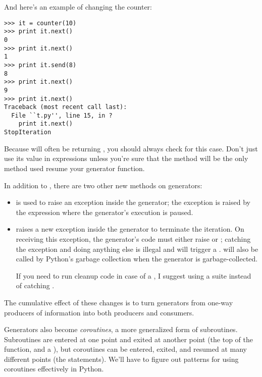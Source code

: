 \documentclass{howto}
\begin{document}
And here's an example of changing the counter:

\begin{verbatim}
>>> it = counter(10)
>>> print it.next()
0
>>> print it.next()
1
>>> print it.send(8)
8
>>> print it.next()
9
>>> print it.next()
Traceback (most recent call last):
  File ``t.py'', line 15, in ?
    print it.next()
StopIteration
\end{verbatim}

Because  will often be returning , you
should always check for this case.  Don't just use its value in
expressions unless you're sure that the  method
will be the only method used resume your generator function.

In addition to , there are two other new methods on
generators:

\begin{itemize}

  \item {} is used to raise an exception inside the
  generator; the exception is raised by the  expression
  where the generator's execution is paused.

  \item {} raises a new 
  exception inside the generator to terminate the iteration.  
  On receiving this
  exception, the generator's code must either raise
   or ; catching the 
  exception and doing anything else is illegal and will trigger
  a .   will also be called by 
  Python's garbage collection when the generator is garbage-collected.

  If you need to run cleanup code in case of a ,
  I suggest using a  suite instead of 
  catching .

\end{itemize}

The cumulative effect of these changes is to turn generators from
one-way producers of information into both producers and consumers.

Generators also become \emph{coroutines}, a more generalized form of
subroutines.  Subroutines are entered at one point and exited at
another point (the top of the function, and a ), but coroutines can be entered, exited, and resumed at
many different points (the  statements).  We'll have to
figure out patterns for using coroutines effectively in Python.
\end{document}

